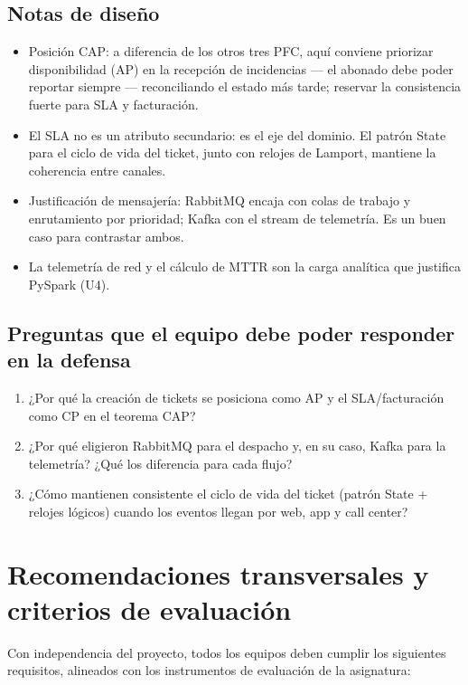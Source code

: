 \documentclass[11pt]{article}
\begin{document}
\subsection{Notas de diseño}
\begin{itemize}[leftmargin=1.2em,itemsep=2pt]
\item Posición CAP: a diferencia de los otros tres PFC, aquí conviene priorizar disponibilidad (AP) en la recepción de incidencias --- el abonado debe poder reportar siempre --- reconciliando el estado más tarde; reservar la consistencia fuerte para SLA y facturación.
\item El SLA no es un atributo secundario: es el eje del dominio. El patrón State para el ciclo de vida del ticket, junto con relojes de Lamport, mantiene la coherencia entre canales.
\item Justificación de mensajería: RabbitMQ encaja con colas de trabajo y enrutamiento por prioridad; Kafka con el stream de telemetría. Es un buen caso para contrastar ambos.
\item La telemetría de red y el cálculo de MTTR son la carga analítica que justifica PySpark (U4).
\end{itemize}
\subsection{Preguntas que el equipo debe poder responder en la defensa}
\begin{enumerate}[leftmargin=1.4em,itemsep=2pt]
\item ¿Por qué la creación de tickets se posiciona como AP y el SLA/facturación como CP en el teorema CAP?
\item ¿Por qué eligieron RabbitMQ para el despacho y, en su caso, Kafka para la telemetría? ¿Qué los diferencia para cada flujo?
\item ¿Cómo mantienen consistente el ciclo de vida del ticket (patrón State + relojes lógicos) cuando los eventos llegan por web, app y call center?
\end{enumerate}
\clearpage
\section{Recomendaciones transversales y criterios de evaluación}
Con independencia del proyecto, todos los equipos deben cumplir los siguientes requisitos, alineados con los
instrumentos de evaluación de la asignatura:
\end{document}
